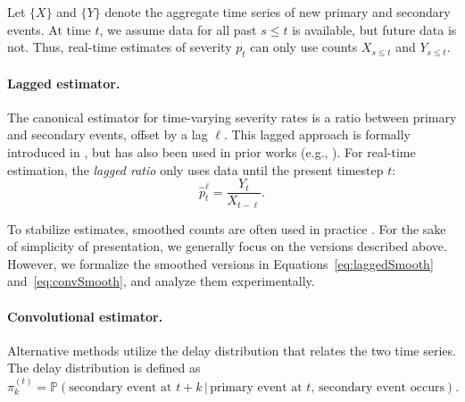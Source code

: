 \documentclass{article}
\renewcommand{\hat}{\widehat} %
\newcommand{\given}{\, \vert \,}
\newcommand{\djmcomment}[1]{{\color{teal}[DJM: #1]}}
\newcommand{\jmgcomment}[1]{{\color{cyan}[JMG: #1]}}
\begin{document}
Let $\{X\}$ and $\{Y\}$ denote the aggregate time series of new primary and secondary events. %
At time $t$, we assume data for all past $s\leq t$ is available, but future data is not. Thus, real-time estimates of severity $p_t$ can only use counts $X_{s\leq t}$ and $Y_{s\leq t}$. 

\paragraph{Lagged estimator.} 

The canonical estimator for time-varying severity rates is a ratio between primary and secondary events, offset by a lag $\ell$. 
This lagged approach is formally introduced in \citet{thomas2021estimating}, but has also been used in prior works (e.g., \citealp{germany,horita2022global,timevar_ifr,yuan2020monitoring,LIU2023100350,atlantic,wsj}). 
For real-time estimation, the \textit{lagged ratio} only uses data until the present timestep $t$: 
\begin{equation}\label{eq:lagged}
    \hat{p}_t^\ell = \frac{Y_t}{X_{t-\ell}}.
\end{equation}

To stabilize estimates, smoothed counts are often used in practice \citep{germany,timevar_ifr,LIU2023100350}. For the sake of simplicity of presentation, we generally focus on the versions described above. However, we formalize the smoothed versions in Equations~\eqref{eq:laggedSmooth} and~\eqref{eq:convSmooth}, and analyze them experimentally.

\paragraph{Convolutional estimator.} Alternative methods utilize the delay distribution that relates
the two time series. The delay distribution is defined as 
\begin{equation*}
    \pi_k^{(t)} = \mathbb{P}(\text{secondary event at $t+k$}\given\text{primary event at $t$, secondary event occurs}).
\end{equation*}
\end{document}
